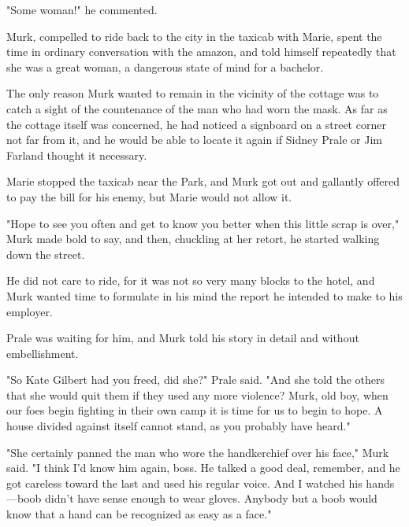 \documentclass{novel}
\begin{document}
"Some woman!" he commented.

\vspace{2\nbs}
\clearpage
\thispagestyle{empty}

\begin{ChapterStart}
\vspace{3\nbs}
\end{ChapterStart}
    
Murk, compelled to ride back to the city in the taxicab with Marie, spent the time in ordinary conversation with the amazon, and told himself repeatedly that she was a great woman, a dangerous state of mind for a bachelor.

The only reason Murk wanted to remain in the vicinity of the cottage was to catch a sight of the countenance of the man who had worn the mask. As far as the cottage itself was concerned, he had noticed a signboard on a street corner not far from it, and he would be able to locate it again if Sidney Prale or Jim Farland thought it necessary.

Marie stopped the taxicab near the Park, and Murk got out and gallantly offered to pay the bill for his enemy, but Marie would not allow it.

"Hope to see you often and get to know you better when this little scrap is over," Murk made bold to say, and then, chuckling at her retort, he started walking down the street.

He did not care to ride, for it was not so very many blocks to the hotel, and Murk wanted time to formulate in his mind the report he intended to make to his employer.

Prale was waiting for him, and Murk told his story in detail and without embellishment.

"So Kate Gilbert had you freed, did she?" Prale said. "And she told the others that she would quit them if they used any more violence? Murk, old boy, when our foes begin fighting in their own camp it is time for us to begin to hope. A house divided against itself cannot stand, as you probably have heard."

"She certainly panned the man who wore the handkerchief over his face," Murk said. "I think I'd know him again, boss. He talked a good deal, remember, and he got careless toward the last and used his regular voice. And I watched his hands---boob didn't have sense enough to wear gloves. Anybody but a boob would know that a hand can be recognized as easy as a face."
\end{document}
